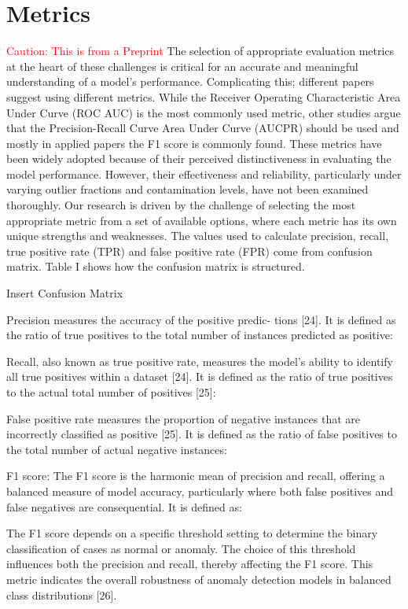 \section{Metrics}
\textcolor{red}{Caution: This is from a Preprint}
The selection of appropriate evaluation metrics at the heart of these challenges 
is critical for an accurate and meaningful understanding of
a model’s performance. Complicating this; different papers suggest using different metrics. While the Receiver
Operating Characteristic Area Under Curve (ROC AUC) is the most commonly used metric, other studies argue that
the Precision-Recall Curve Area Under Curve (AUCPR) should be used and mostly in applied papers the F1 score
is commonly found. These metrics have been widely adopted because of their perceived distinctiveness in evaluating the model performance.
However, their effectiveness and reliability, particularly under varying outlier fractions and contamination levels, have not
been examined thoroughly. Our research is driven by the challenge of selecting the most appropriate metric from a
set of available options, where each metric has its own unique strengths and weaknesses.
The values used to calculate precision, recall, true positive
rate (TPR) and false positive rate (FPR) come from confusion
matrix. Table I shows how the confusion matrix is structured. 

Insert Confusion Matrix

Precision measures the accuracy of the positive predic-
tions [24]. It is defined as the ratio of true positives to the
total number of instances predicted as positive:
 

Recall, also known as true positive rate, measures the
model’s ability to identify all true positives within a
dataset [24]. It is defined as the ratio of true positives to the
actual total number of positives [25]:


False positive rate measures the proportion of negative
instances that are incorrectly classified as positive [25]. It is
defined as the ratio of false positives to the total number of
actual negative instances:


F1 score: The F1 score is the harmonic mean of
precision and recall, offering a balanced measure of model
accuracy, particularly where both false positives and false
negatives are consequential. It is defined as:


The F1 score depends on a specific threshold setting to
determine the binary classification of cases as normal or
anomaly. The choice of this threshold influences both the
precision and recall, thereby affecting the F1 score. This metric
indicates the overall robustness of anomaly detection models
in balanced class distributions [26].


